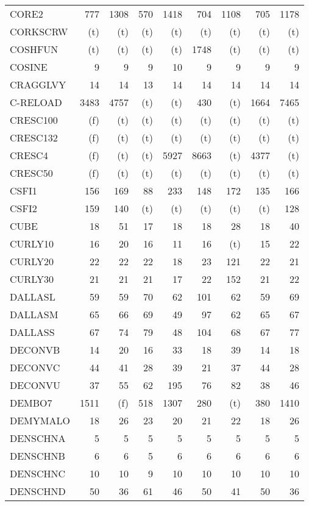 \documentclass[11pt,twoside]{article}
\begin{document}
{\begin{longtable}[c]{|l|r|r|r|r|r|r|r|r|}
 CORE2 & 777 & 1308 & 570 & 1418 & 704 & 1108 & 705 & 1178 \\
 CORKSCRW & (t) & (t) & (t) & (t) & (t) & (t) & (t) & (t) \\
 COSHFUN & (t) & (t) & (t) & (t) & 1748 & (t) & (t) & (t) \\
 COSINE & 9 & 9 & 9 & 10 & 9 & 9 & 9 & 9 \\
 CRAGGLVY & 14 & 14 & 13 & 14 & 14 & 14 & 14 & 14 \\
 C-RELOAD & 3483 & 4757 & (t) & (t) & 430 & (t) & 1664 & 7465 \\
 CRESC100 & (f) & (t) & (t) & (t) & (t) & (t) & (t) & (t) \\
 CRESC132 & (f) & (t) & (t) & (t) & (t) & (t) & (t) & (t) \\
 CRESC4 & (f) & (t) & (t) & 5927 & 8663 & (t) & 4377 & (t) \\
 CRESC50 & (f) & (t) & (t) & (t) & (t) & (t) & (t) & (t) \\
 CSFI1 & 156 & 169 & 88 & 233 & 148 & 172 & 135 & 166 \\
 CSFI2 & 159 & 140 & (t) & (t) & (t) & (t) & (t) & 128 \\
 CUBE & 18 & 51 & 17 & 18 & 18 & 28 & 18 & 40 \\
 CURLY10 & 16 & 20 & 16 & 11 & 16 & (t) & 15 & 22 \\
 CURLY20 & 22 & 22 & 22 & 18 & 23 & 121 & 22 & 21 \\
 CURLY30 & 21 & 21 & 21 & 17 & 22 & 152 & 21 & 22 \\
 DALLASL & 59 & 59 & 70 & 62 & 101 & 62 & 59 & 69 \\
 DALLASM & 65 & 66 & 69 & 49 & 97 & 62 & 65 & 67 \\
 DALLASS & 67 & 74 & 79 & 48 & 104 & 68 & 67 & 77 \\
 DECONVB & 14 & 20 & 16 & 33 & 18 & 39 & 14 & 18 \\
 DECONVC & 44 & 41 & 28 & 39 & 21 & 37 & 44 & 28 \\
 DECONVU & 37 & 55 & 62 & 195 & 76 & 82 & 38 & 46 \\
 DEMBO7 & 1511 & (f) & 518 & 1307 & 280 & (t) & 380 & 1410 \\
 DEMYMALO & 18 & 26 & 23 & 20 & 21 & 22 & 18 & 26 \\
 DENSCHNA & 5 & 5 & 5 & 5 & 5 & 5 & 5 & 5 \\
 DENSCHNB & 6 & 6 & 5 & 6 & 6 & 6 & 6 & 6 \\
 DENSCHNC & 10 & 10 & 9 & 10 & 10 & 10 & 10 & 10 \\
 DENSCHND & 50 & 36 & 61 & 46 & 50 & 41 & 50 & 36 \\

\end{longtable}}
\end{document}
